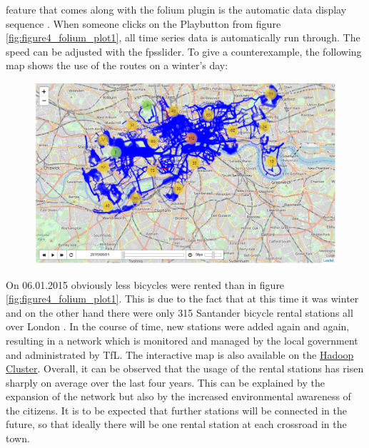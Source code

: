 feature that comes along with the folium plugin is the automatic data display sequence \cite{RN5}. When
someone clicks on the \glqq Play\grqq button from figure \ref{fig:figure4_folium_plot1}, all time series data is automatically run through.
The speed can be adjusted with the \glqq fps\grqq slider.
To give a counterexample, the following map shows the use of the routes on a winter’s day:
\begin{figure}[H]
\hspace{-1.6cm}
\includegraphics[width=1.2\textwidth]{img/figure5_folium_plot2}\label{fig:figure5_folium_plot2}
\label{fig:figure5_folium_plot2}
\end{figure}
On 06.01.2015 obviously less bicycles were rented than in figure \ref{fig:figure4_folium_plot1}. This is due to the fact that at
this time it was winter and on the other hand there were only 315 Santander bicycle rental stations
all over London \cite{RN6}. In the course of time, new stations were added again and again, resulting in
a network which is monitored and managed by the local government and administrated by TfL.
The interactive map is also available on the \href{http://i-hadoop-01.informatik.hs-ulm.de/routes_frequency.html}{Hadoop Cluster}.
Overall, it can be observed that the usage of the rental stations has risen sharply on average over
the last four years. This can be explained by the expansion of the network but also by the increased
environmental awareness of the citizens. It is to be expected that further stations will be connected
in the future, so that ideally there will be one rental station at each crossroad in the town.
